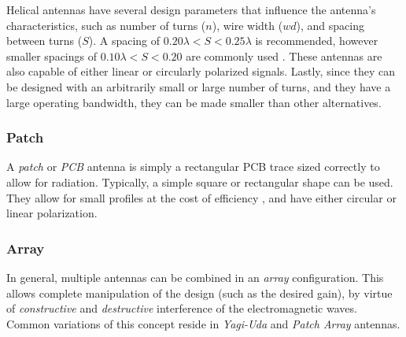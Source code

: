 Helical antennas have several design parameters that influence the antenna's characteristics, such as number of turns ($n$), wire width ($wd$), and spacing between turns ($S$). A spacing of $0.20 \lambda < S < 0.25 \lambda$ is recommended, however smaller spacings of $0.10 \lambda < S < 0.20$ are commonly used \cite{site-helicalCalculator}. These antennas are also capable of either linear or circularly polarized signals. Lastly, since they can be designed with an arbitrarily small or large number of turns, and they have a large operating bandwidth, they can be made smaller than other alternatives.

\subsubsection{Patch}
A \textit{patch} or \textit{PCB} antenna is simply a rectangular PCB trace sized correctly to allow for radiation. Typically, a simple square or rectangular shape can be used. They allow for small profiles at the cost of efficiency \cite{site-antennaTheory}, and have either circular or linear polarization.

\subsubsection{Array}
In general, multiple antennas can be combined in an \textit{array} configuration. This allows complete manipulation of the design (such as the desired gain), by virtue of \textit{constructive} and \textit{destructive} interference of the electromagnetic waves. Common variations of this concept reside in \textit{Yagi-Uda} and \textit{Patch Array} antennas. \cite{site-antennaTheory}


